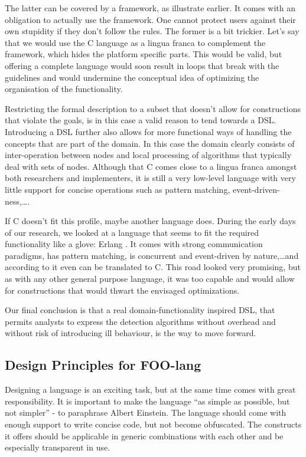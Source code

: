 \documentclass[conference]{IEEEtran}
\begin{document}
The latter can be covered by a framework, as illustrate earlier. It comes with
an obligation to actually use the framework. One cannot protect users against
their own stupidity if they don't follow the rules. The former is a bit
trickier. Let's say that we would use the C language as a lingua franca to
complement the framework, which hides the platform specific parts. This would
be valid, but offering a complete language would soon result in loops that
break with the guidelines and would undermine the conceptual idea of optimizing
the organisation of the functionality.

Restricting the formal description to a subset that doesn't allow for
constructions that violate the goals, is in this case a valid reason to tend
towards a DSL. Introducing a DSL further also allows for more functional ways
of handling the concepts that are part of the domain. In this case the domain
clearly consists of inter-operation between nodes and local processing of
algorithms that typically deal with sets of nodes. Although that C comes close
to a lingua franca amongst both researchers and implementers, it is still a
very low-level language with very little support for concise operations such as
pattern matching, event-driven-ness,\dots.

If C doesn't fit this profile, maybe another language does. During the early
days of our research, we looked at a language that seems to fit the required
functionality like a glove: Erlang \cite{armstrong1993concurrent}. It comes
with strong communication paradigms, has pattern matching, is concurrent and
event-driven by nature,\dots and according to \cite{wong1998compiling} it even
can be translated to C. This road looked very promising, but as with any other
general purpose language, it was too capable and would allow for constructions
that would thwart the envisaged optimizations.

Our final conclusion is that a real domain-functionality inspired DSL, that
permits analysts to express the detection algorithms without overhead and
without risk of introducing ill behaviour, is the way to move forward.

\subsection{Design Principles for FOO-lang}
\label{subsection:design}

Designing a language is an exciting task, but at the same time comes with great
responsibility. It is important to make the language ``as simple as possible,
but not simpler'' - to paraphrase Albert Einstein. The language should come
with enough support to write concise code, but not become obfuscated. The
constructs it offers should be applicable in generic combinations with each
other and be especially transparent in use.
\end{document}
